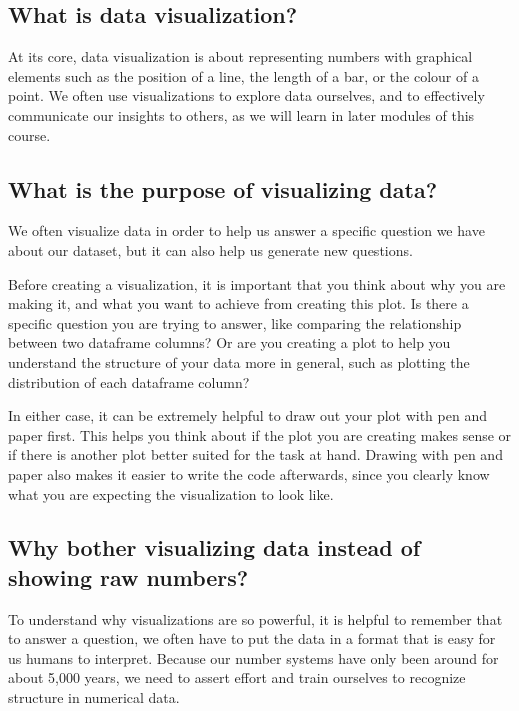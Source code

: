 \documentclass[
  letterpaper,
  DIV=11,
  numbers=noendperiod]{scrreprt}
\begin{document}
\subsection{What is data
visualization?}\label{what-is-data-visualization}

At its core, data visualization is about representing numbers with
graphical elements such as the position of a line, the length of a bar,
or the colour of a point. We often use visualizations to explore data
ourselves, and to effectively communicate our insights to others, as we
will learn in later modules of this course.

\subsection{What is the purpose of visualizing
data?}\label{what-is-the-purpose-of-visualizing-data}

We often visualize data in order to help us answer a specific question
we have about our dataset, but it can also help us generate new
questions.

Before creating a visualization, it is important that you think about
why you are making it, and what you want to achieve from creating this
plot. Is there a specific question you are trying to answer, like
comparing the relationship between two dataframe columns? Or are you
creating a plot to help you understand the structure of your data more
in general, such as plotting the distribution of each dataframe column?

In either case, it can be extremely helpful to draw out your plot with
pen and paper first. This helps you think about if the plot you are
creating makes sense or if there is another plot better suited for the
task at hand. Drawing with pen and paper also makes it easier to write
the code afterwards, since you clearly know what you are expecting the
visualization to look like.

\subsection{Why bother visualizing data instead of showing raw
numbers?}\label{why-bother-visualizing-data-instead-of-showing-raw-numbers}

To understand why visualizations are so powerful, it is helpful to
remember that to answer a question, we often have to put the data in a
format that is easy for us humans to interpret. Because our number
systems have only been around for about 5,000 years, we need to assert
effort and train ourselves to recognize structure in numerical data.
\end{document}
